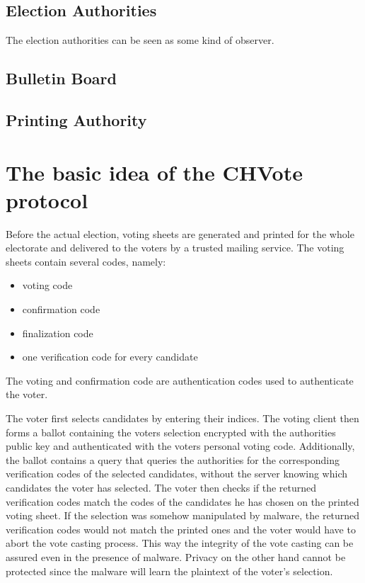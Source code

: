 \subsection{Election Authorities}
The election authorities can be seen as some kind of observer. 
\subsection{Bulletin Board}
\subsection{Printing Authority}

\section{The basic idea of the CHVote protocol}
Before the actual election, voting sheets are generated and printed for the whole electorate and delivered to the voters by a trusted mailing service. The voting sheets contain several codes, namely:

\begin{itemize}
	\item voting code
	\item confirmation code
	\item finalization code
	\item one verification code for every candidate
\end{itemize}

The voting and confirmation code are authentication codes used to authenticate the voter.

The voter first selects candidates by entering their indices. The voting client then forms a ballot containing the voters selection encrypted with the authorities public key and authenticated with the voters personal voting code. Additionally, the ballot contains a query that queries the authorities for the corresponding verification codes of the selected candidates, without the server knowing which candidates the voter has selected. The voter then checks if the returned verification codes match the codes of the candidates he has chosen on the printed voting sheet. If the selection was somehow manipulated by malware, the returned verification codes would not match the printed ones and the voter would have to abort the vote casting process. This way the integrity of the vote casting can be assured even in the presence of malware. Privacy on the other hand cannot be protected since the malware will learn the plaintext of the voter's selection.

